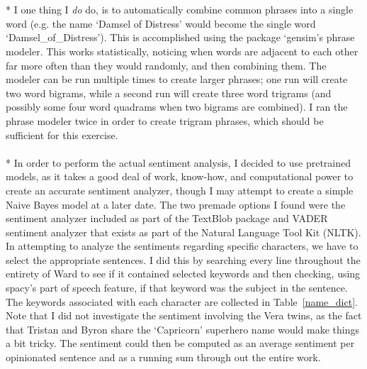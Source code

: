 \documentclass[11pt]{article}
\begin{document}
\\
\\*
I one thing I \emph{do} do, is to automatically combine common phrases into a single word (e.g. the name `Damsel of Distress' would become the single word `Damsel\_of\_Distress'). This is accomplished using the package `gensim's phrase modeler. This works statistically, noticing when words are adjacent to each other far more often than they would randomly, and then combining them. The modeler can be run multiple times to create larger phrases; one run will create two word bigrams, while a second run will create three word trigrams (and possibly some four word quadrams when two bigrams are combined). I ran the phrase modeler twice in order to create trigram phrases, which should be sufficient for this exercise. 
\\
\\*
In order to perform the actual sentiment analysis, I decided to use pretrained models, as it takes a good deal of work, know-how, and computational power to create an accurate sentiment analyzer, though I may attempt to create a simple Naive Bayes model at a later date. The two premade options I found were the sentiment analyzer included as part of the TextBlob package and VADER sentiment analyzer that exists as part of the Natural Language Tool Kit (NLTK). In attempting to analyze the sentiments regarding specific characters, we have to select the appropriate sentences. I did this by searching every line throughout the entirety of Ward to see if it contained selected keywords and then checking, using spacy's part of speech feature, if that keyword was the subject in the sentence. The keywords associated with each character are collected in Table~\ref{name_dict}. Note that I did not investigate the sentiment involving the Vera twins, as the fact that Tristan and Byron share the `Capricorn' superhero name would make things a bit tricky. The sentiment could then be computed as an average sentiment per opinionated sentence and as a running sum through out the entire work.
\end{document}

